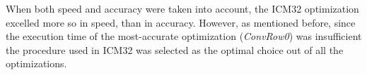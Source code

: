 When both speed and accuracy were taken into account, the ICM32 optimization excelled more so in speed, than in accuracy. However, as mentioned before, since the execution time of the most-accurate optimization (\textit{ConvRow0}) was insufficient the procedure used in ICM32 was selected as the optimal choice out of all the optimizations.